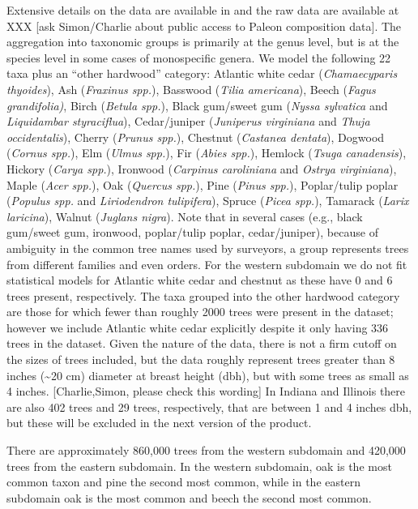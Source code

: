 \documentclass[12pt]{article}\usepackage[]{graphicx}\usepackage[]{color}
\begin{document}
Extensive details on the data are available in \cite{Gori:etal:2015}
and the raw data are available at XXX {[}ask Simon/Charlie about public
access to Paleon composition data{]}. The aggregation into taxonomic
groups is primarily at the genus level, but is at the species level
in some cases of monospecific genera. We model the following 22 taxa
plus an ``other hardwood'' category: Atlantic white cedar (\emph{Chamaecyparis
thyoides}), Ash (\emph{Fraxinus spp.}), Basswood (\emph{Tilia americana}),
Beech (\emph{Fagus grandifolia)}, Birch (\emph{Betula spp.}), Black
gum/sweet gum (\emph{Nyssa sylvatica} and \emph{Liquidambar styraciflua}),
Cedar/juniper (\emph{Juniperus virginiana} and \emph{Thuja occidentalis}),
Cherry (\emph{Prunus spp.}), Chestnut (\emph{Castanea dentata}), Dogwood
(\emph{Cornus spp.}), Elm (\emph{Ulmus spp.}), Fir (\emph{Abies spp.}),
Hemlock (\emph{Tsuga canadensis}), Hickory (\emph{Carya spp.}), Ironwood
(\emph{Carpinus caroliniana} and \emph{Ostrya virginiana}), Maple
(\emph{Acer spp.}), Oak (\emph{Quercus spp.}), Pine (\emph{Pinus spp.}),
Poplar/tulip poplar (\emph{Populus spp.} and \emph{Liriodendron tulipifera}),
Spruce (\emph{Picea spp.}), Tamarack (\emph{Larix laricina}), Walnut
(\emph{Juglans nigra}). Note that in several cases (e.g., black gum/sweet
gum, ironwood, poplar/tulip poplar, cedar/juniper), because of ambiguity
in the common tree names used by surveyors, a group represents trees
from different families and even orders. For the western subdomain
we do not fit statistical models for Atlantic white cedar and chestnut
as these have 0 and 6 trees present, respectively. The taxa grouped
into the other hardwood category are those for which fewer than roughly
2000 trees were present in the dataset; however we include Atlantic
white cedar explicitly despite it only having 336 trees in the dataset.
Given the nature of the data, there is not a firm cutoff on the sizes
of trees included, but the data roughly represent trees greater than
8 inches (\textasciitilde{}20 cm) diameter at breast height (dbh),
but with some trees as small as 4 inches. {[}Charlie,Simon, please
check this wording{]} In Indiana and Illinois there are also 402 trees
and 29 trees, respectively, that are between 1 and 4 inches dbh, but
these will be excluded in the next version of the product. 

There are approximately 860,000 trees from the western subdomain and
420,000 trees from the eastern subdomain. In the western subdomain,
oak is the most common taxon and pine the second most common, while
in the eastern subdomain oak is the most common and beech the second
most common.
\end{document}

